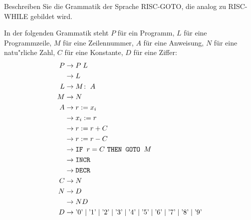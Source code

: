 Beschreiben Sie die Grammatik der Sprache RISC-GOTO, die analog zu
RISC-WHILE gebildet wird.


\begin{loesung}
In der folgenden Grammatik steht $P$ für ein Programm, $L$ für
eine Programmzeile, $M$ für eine Zeilennummer, $A$ für eine
Anweisung, $N$ für eine natu"rliche Zahl, $C$ für eine Konstante,
$D$ für eine Ziffer:
\begin{align*}
P&\rightarrow P\; L\\
 &\rightarrow L\\
L&\rightarrow M\colon \; A\\
M&\rightarrow N\\
A&\rightarrow r := x_i\\
 &\rightarrow x_i := r\\
 &\rightarrow r := r + C\\
 &\rightarrow r := r - C\\
 &\rightarrow \text{\tt IF } r = C \text{ \tt THEN GOTO } M\\
 &\rightarrow \texttt{INCR}\\
 &\rightarrow \texttt{DECR}\\
C&\rightarrow N\\
N&\rightarrow D\\
 &\rightarrow ND\\
D&\rightarrow
\text{'0'}\;|\;
\text{'1'}\;|\;
\text{'2'}\;|\;
\text{'3'}\;|\;
\text{'4'}\;|\;
\text{'5'}\;|\;
\text{'6'}\;|\;
\text{'7'}\;|\;
\text{'8'}\;|\;
\text{'9'}
\end{align*}
\end{loesung}
